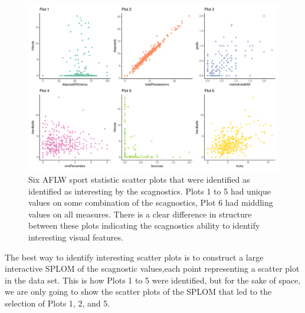 \begin{Schunk}
\begin{figure}

{\centering \includegraphics[width=1\linewidth]{mason-lee-laa-cook_files/figure-latex/AFLW-scatters-static-1} 

}

\caption[Six AFLW sport statistic scatter plots that were identified as identified as interesting by the scagnostics]{Six AFLW sport statistic scatter plots that were identified as identified as interesting by the scagnostics. Plots 1 to 5 had unique values on some combination of the scagnostics, Plot 6 had middling values on all measures. There is a clear difference in structure between these plots indicating the scagnostics ability to identify interesting visual features.}\label{fig:AFLW-scatters-static}
\end{figure}
\end{Schunk}

The best way to identify interesting scatter plots is to construct a
large interactive SPLOM of the scagnostic values,each point representing
a scatter plot in the data set. This is how Plots 1 to 5 were
identified, but for the sake of space, we are only going to show the
scatter plots of the SPLOM that led to the selection of Plots 1, 2, and
5.

